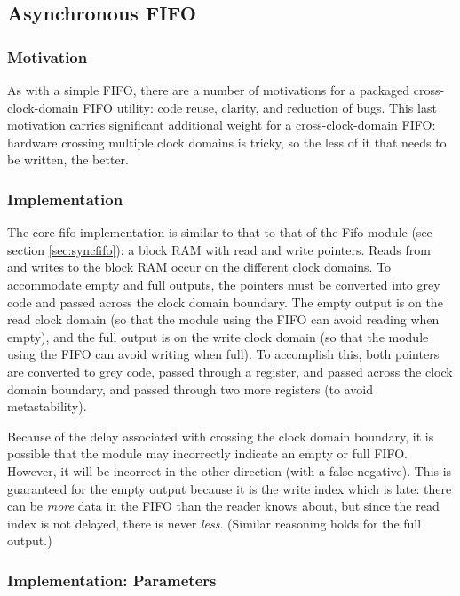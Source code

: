 \documentclass[10pt]{article}
\begin{document}
\subsection{Asynchronous FIFO}

\label{sec:fifo}

\subsubsection{Motivation}

As with a simple FIFO, there are a number of motivations for a packaged
cross-clock-domain FIFO utility: code reuse, clarity, and reduction of bugs.
This last motivation carries significant additional weight for a
cross-clock-domain FIFO: hardware crossing multiple clock domains is tricky,
so the less of it that needs to be written, the better.

\subsubsection{Implementation}

The core fifo implementation is similar to that to that of the Fifo module
(see section \ref{sec:syncfifo}): a block RAM with read and write
pointers.  Reads from and writes to the block RAM occur on the different
clock domains.  To accommodate empty and full outputs, the pointers must be
converted into grey code and passed across the clock domain boundary.  The
empty output is on the read clock domain (so that the module using the FIFO
can avoid reading when empty), and the full output is on the write clock
domain (so that the module using the FIFO can avoid writing when full).  To
accomplish this, both pointers are converted to grey code, passed through a
register, and passed across the clock domain boundary, and passed through
two more registers (to avoid metastability).

Because of the delay associated with crossing the clock domain boundary, it
is possible that the module may incorrectly indicate an empty or full FIFO. 
However, it will be incorrect in the other direction (with a false
negative).  This is guaranteed for the empty output because it is the write
index which is late: there can be \textit{more} data in the FIFO than the
reader knows about, but since the read index is not delayed, there is never
\textit{less}.  (Similar reasoning holds for the full output.)

\subsubsection{Implementation: Parameters}
\end{document}
